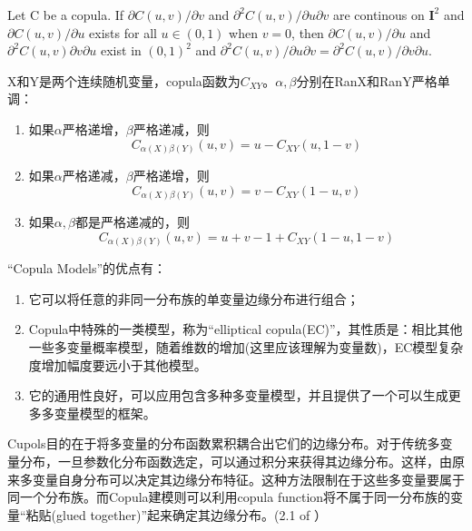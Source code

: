 \begin{theorem}
    Let C be a copula. If $\partial C(u,v)/\partial v$ and $\partial^2C(u,v)/\partial u\partial v$ are continous on $\mathbf{I}^2$ and $\partial C(u,v)/\partial u$ exists for all $u \in (0,1)$ when $v = 0$, then $\partial C(u,v)/\partial u$ and $\partial^2C(u,v)\partial v\partial u$ exist in $(0,1)^2$ and $\partial^2C(u,v)/\partial u\partial v = \partial^2C(u,v)/\partial v \partial u$.
    \label{thr-2.2.8}
\end{theorem}



\begin{theorem}
    X和Y是两个连续随机变量，copula函数为$C_{XY}$。$\alpha,\beta$分别在RanX和RanY严格单调：
    \begin{enumerate}
        \item 如果$\alpha$严格递增，$\beta$严格递减，则
            \begin{equation*}
                C_{\alpha(X)\beta(Y)}(u,v) = u- C_{XY}(u,1-v)
            \end{equation*}
        \item 如果$\alpha$严格递减，$\beta$严格递增，则
            \begin{equation*}
                 C_{\alpha(X)\beta(Y)}(u,v) = v- C_{XY}(1-u,v)
            \end{equation*}
        \item 如果$\alpha,\beta$都是严格递减的，则
            \begin{equation*}
                C_{\alpha(X)\beta(Y)}(u,v) = u+v-1+C_{XY}(1-u,1-v)
            \end{equation*}
    \end{enumerate}
    \label{thr2.4.4}

\end{theorem}

``Copula Models''的优点有\cite{Smith2009}：
\begin{enumerate}
    \item 它可以将任意的非同一分布族的单变量边缘分布进行组合；
    \item Copula中特殊的一类模型，称为``elliptical copula(EC)''，其性质是：相比其他一些多变量概率模型，随着维数的增加(这里应该理解为变量数)，EC模型复杂度增加幅度要远小于其他模型。
    \item 它的通用性良好，可以应用包含多种多变量模型，并且提供了一个可以生成更多多变量模型的框架。
\end{enumerate}

\textcolor[rgb]{1,0,0}{Cupols目的在于将多变量的分布函数累积耦合出它们的边缘分布。对于传统多变量分布，一旦参数化分布函数选定，可以通过积分来获得其边缘分布。这样，由原来多变量自身分布可以决定其边缘分布特征。这种方法限制在于这些多变量要属于同一个分布族。而Copula建模则可以利用copula function将不属于同一分布族的变量``粘贴(glued together)''起来确定其边缘分布。(2.1 of \cite{Smith2009}}）



